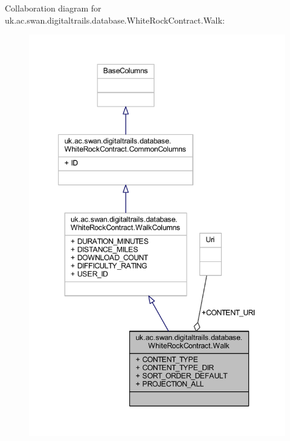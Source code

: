 Collaboration diagram for uk.\+ac.\+swan.\+digitaltrails.\+database.\+White\+Rock\+Contract.\+Walk\+:
\nopagebreak
\begin{figure}[H]
\begin{center}
\leavevmode
\includegraphics[width=347pt]{classuk_1_1ac_1_1swan_1_1digitaltrails_1_1database_1_1_white_rock_contract_1_1_walk__coll__graph}
\end{center}
\end{figure}
